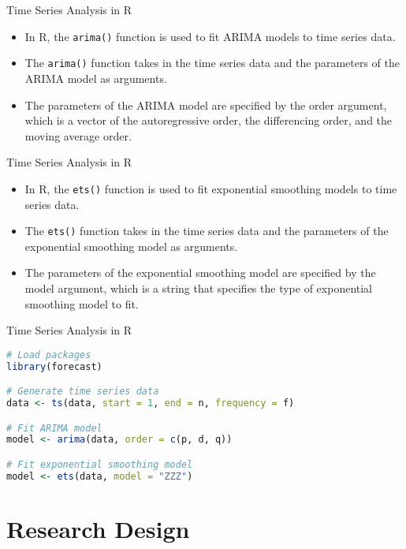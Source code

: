 \documentclass[serif, 9pt, aspectratio=32]{beamer}
\begin{document}
\begin{frame}{Time Series Analysis in R}
    \begin{itemize}
        \setlength{\itemsep}{2em}
        \item In R, the \texttt{arima()} function is used to fit ARIMA models to time series data.
        \item The \texttt{arima()} function takes in the time series data and the parameters of the ARIMA model as arguments.
        \item The parameters of the ARIMA model are specified by the order argument, which is a vector of the autoregressive order, the differencing order, and the moving average order.
    \end{itemize}
\end{frame}

\begin{frame}{Time Series Analysis in R}
    \begin{itemize}
        \setlength{\itemsep}{2em}
        \item In R, the \texttt{ets()} function is used to fit exponential smoothing models to time series data.
        \item The \texttt{ets()} function takes in the time series data and the parameters of the exponential smoothing model as arguments.
        \item The parameters of the exponential smoothing model are specified by the model argument, which is a string that specifies the type of exponential smoothing model to fit.
    \end{itemize}
\end{frame}

\begin{frame}[fragile]{Time Series Analysis in R}
    \begin{lstlisting}[language=R]
# Load packages
library(forecast)

# Generate time series data
data <- ts(data, start = 1, end = n, frequency = f)

# Fit ARIMA model
model <- arima(data, order = c(p, d, q))

# Fit exponential smoothing model
model <- ets(data, model = "ZZZ")
    \end{lstlisting}
\end{frame}

\section{Research Design}
\end{document}
